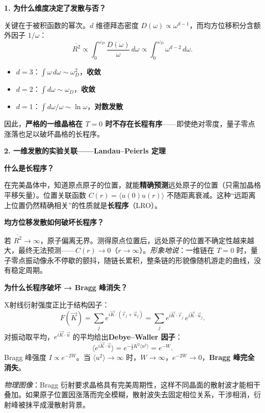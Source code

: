 \begin{insightbox}[物理图像与概念深化]
\textbf{1. 为什么维度决定了发散与否？}

关键在于被积函数的幂次。$d$ 维德拜态密度 $D(\omega)\propto\omega^{d-1}$，而均方位移积分含额外因子 $1/\omega$：
\begin{equation}
\overline{R^2}\propto\int_0^{\omega_D}\frac{D(\omega)}{\omega}\,d\omega\propto\int_0^{\omega_D}\omega^{d-2}\,d\omega.
\end{equation}
\begin{itemize}
    \item $d=3$：$\int\omega\,d\omega\sim\omega_D^2$，\textbf{收敛}
    \item $d=2$：$\int d\omega\sim\omega_D$，\textbf{收敛}
    \item $d=1$：$\int d\omega/\omega\sim\ln\omega$，\textbf{对数发散}
\end{itemize}
因此，\textbf{严格的一维晶格在 $T=0$ 时不存在长程有序}——即使绝对零度，量子零点涨落也足以破坏晶格的长程序。

\textbf{2. 一维发散的实验关联——Landau--Peierls 定理}

\begin{insightbox}
\textbf{什么是长程序？}

在完美晶体中，知道原点原子的位置，就能\textbf{精确预测}远处原子的位置（只需加晶格平移矢量）。位置关联函数 $C(r)=\langle u(0)u(r)\rangle$ 不随距离衰减。这种``远距离上位置仍然精确相关''的性质就是\textbf{长程序}（LRO）。

\textbf{均方位移发散如何破坏长程序？}

若 $\overline{R^2}\to\infty$，原子偏离无界。测得原点位置后，远处原子的位置不确定性越来越大，最终无法预测——$C(r)\to0$（$r\to\infty$）。\textit{形象地说}：一维链在 $T=0$ 时，量子零点振动像永不停歇的颤抖，随链长累积，整条链的形貌像随机游走的曲线，没有稳定周期。

\textbf{为什么长程序破坏 → Bragg 峰消失？}

X射线衍射强度正比于结构因子：
\[
F(\vec K)=\sum_j e^{i\vec K\cdot(\vec r_j+\vec u_j)}=\sum_j e^{i\vec K\cdot\vec r_j}\,e^{i\vec K\cdot\vec u_j}.
\]
对振动取平均，$e^{i\vec K\cdot\vec u}$ 的平均给出\textbf{Debye--Waller 因子}：
\[
\langle e^{i\vec K\cdot\vec u}\rangle = e^{-\frac12K^2\langle u^2\rangle} = e^{-W}.
\]
Bragg 峰强度 $I\propto e^{-2W}$。当 $\langle u^2\rangle\to\infty$ 时，$W\to\infty$，$e^{-2W}\to0$，\textbf{Bragg 峰完全消失}。

\textit{物理图像}：Bragg 衍射要求晶格具有完美周期性，这样不同晶面的散射波才能相干叠加。如果原子位置因涨落而完全模糊，散射波失去固定相位关系，干涉相消，衍射峰被抹平成漫散射背景。
\end{insightbox}


\end{insightbox}
